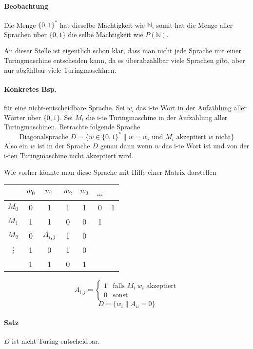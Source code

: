\paragraph*{Beobachtung} Die Menge $\{0,1\}^*$ hat dieselbe Mächtigkeit wie $\mathbb{N}$, somit hat die Menge aller Sprachen über $\{0,1\}$ die selbe Mächtigkeit wie $P(\mathbb{N})$.

\par\medskip An dieser Stelle ist eigentlich schon klar, dass man nicht jede Sprache mit einer Turingmaschine entscheiden kann, da es überabzählbar viele Sprachen gibt, aber nur abzählbar viele Turingmaschinen.

\paragraph*{Konkretes Bsp.} für eine nicht-entscheidbare Sprache. Sei $w_i$ das i-te Wort in der Aufzählung aller Wörter über $\{0,1\}$. Sei $M_i$ die i-te Turingmaschine in der Aufzählung aller Turingmaschinen. Betrachte folgende Sprache $$ \text{Diagonalsprache } D=\{ w\in\{0,1\}^* \| w=w_i \text{ und } M_i \text{ akzeptiert } w \text{ nicht} \} $$ Also ein $w$ ist in der Sprache $D$ genau dann wenn $w$ das i-te Wort ist und von der i-ten Turingmaschine nicht akzeptiert wird.

\par\medskip Wie vorher könnte man diese Sprache mit Hilfe einer Matrix darstellen\par\medskip
\begin{table}[htb!]
\centering
\begin{tabular}{c|c c c c c c}
 & $w_0$ & $w_1$ & $w_2$ & $w_3$ & \dots & \\
\hline
$M_0$ & 0 & 1 & 1 & 1 & 0 & 1 \\
$M_1$ & 1 & 1 & 0 & 0 & 1 &  \\
$M_2$ & 0 & $A_{i,j}$ & 1 & 0 &  &  \\
\vdots & 1 & 0 & 1 & 0 &  &  \\
 & 1 & 1 & 0 & 1 &  &  \\
\end{tabular}
\end{table}
$$ A_{i,j} = \begin{cases}1&\text{falls } M_i\ w_i \text{ akzeptiert} \\ 0 & \text{sonst}\end{cases} $$
$$ D=\{ w_i \| A_{ii}=0 \}$$

\paragraph*{Satz} $D$ ist nicht Turing-entscheidbar.

